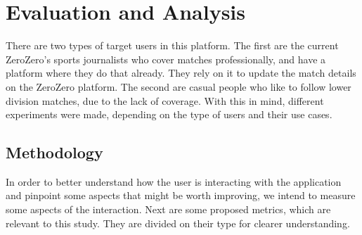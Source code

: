 \chapter{Evaluation and Analysis}\label{chap:evaluation-and-analysis}


There are two types of target users in this platform. The first are the current ZeroZero's sports journalists who cover matches professionally, and have a platform where they do that already. They rely on it to update the match details on the ZeroZero platform. The second are casual people who like to follow lower division matches, due to the lack of coverage. With this in mind, different experiments were made, depending on the type of users and their use cases.

\section{Methodology}

In order to better understand how the user is interacting with the application and pinpoint some aspects that might be worth improving, we intend to measure some aspects of the interaction. Next are some proposed metrics, which are relevant to this study. They are divided on their type for clearer understanding.

